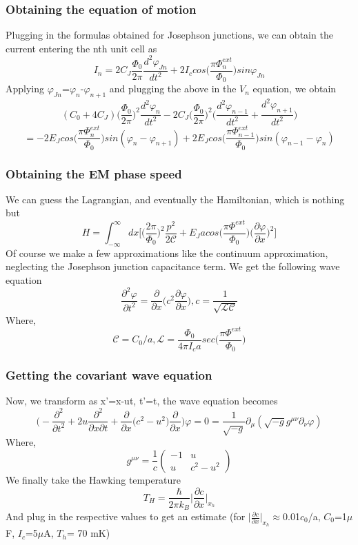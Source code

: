 \documentclass[11pt]{beamer}
\begin{document}
		\begin{frame}
			\frametitle{Obtaining the equation of motion}
			Plugging in the formulas obtained for Josephson junctions, we can obtain the current entering the nth unit cell as
			\[I_n=2 C_J \frac{\Phi_0}{2\pi}\frac{d^2\varphi_{Jn}}{dt^2}+2I_ccos\bigg(\frac{\pi \Phi^{ext}_n}{\Phi_0}\bigg)sin\varphi_{Jn}\]
			Applying $\varphi_{Jn}$=$\varphi_{n}$-$\varphi_{n+1}$ and plugging the above in the $V_n$ equation, we obtain
			\[(C_0+4C_J)\bigg(\frac{\Phi_0}{2\pi}\bigg)^2\frac{d^2\varphi_{n}}{dt^2}-2C_J\bigg(\frac{\Phi_0}{2\pi}\bigg)^2\bigg( \frac{d^2\varphi_{n-1}}{dt^2}+\frac{d^2\varphi_{n+1}}{dt^2}  \bigg)\]
			\[=-2E_Jcos\bigg(\frac{\pi \Phi^{ext}_n}{\Phi_0}\bigg)sin(\varphi_{n}-\varphi_{n+1})+2E_Jcos\bigg(\frac{\pi \Phi^{ext}_{n-1}}{\Phi_0}\bigg)sin(\varphi_{n-1}-\varphi_{n})\]
		\end{frame}
		
		\begin{frame}
			\frametitle{Obtaining the EM phase speed}
			We can guess the Lagrangian, and eventually the Hamiltonian, which is nothing but
			\[H=\int_{-\infty}^{\infty}dx\bigg[\bigg(\frac{2\pi}{\Phi_0}\bigg)^2\frac{p^2}{2\mathcal{C}}+E_Jacos\bigg(\frac{\pi \Phi^{ext}}{\Phi_0}\bigg)\bigg(\frac{\partial\varphi}{\partial x}\bigg)^2\bigg]\]
			Of course we make a few approximations like the continuum approximation, neglecting the Josephson junction capacitance term. 
			We get the following wave equation
			\[\frac{\partial^2\varphi}{\partial t^2}=\frac{\partial}{\partial x}\bigg(c^2\frac{\partial \varphi}{\partial x}\bigg),c=\frac{1}{\sqrt{\mathcal{L}\mathcal{C}}}\]
			Where,
			\[\mathcal{C}=C_0/a,\mathcal{L}=\frac{\Phi_0}{4\pi I_ca}sec\bigg(\frac{\pi \Phi^{ext}}{\Phi_0}\bigg)\]
		\end{frame}
		
			\begin{frame}
			\frametitle{Getting the covariant wave equation}
			Now, we transform as x'=x-ut, t'=t, the wave equation becomes 
			\[\bigg(-\frac{\partial^2}{\partial t^2}+2u\frac{\partial^2}{\partial x\partial t}+\frac{\partial}{\partial x}\big(c^2-u^2\big)\frac{\partial}{\partial x}\bigg)\varphi=0=\frac{1}{\sqrt{-g}}\partial_\mu(\sqrt{-g}g^{\mu\nu}\partial_\nu\varphi)\]
			Where,
			\[ g^{\mu\nu}=\frac{1}{c}
			\begin{pmatrix}
				-1 & u \\
				u & c^2-u^2 
			\end{pmatrix}
			\]
			We finally take the Hawking temperature
			\[T_H=\frac{\hbar}{2\pi k_B}\bigg|\frac{\partial c}{\partial x}\bigg|_{x_h}\]
			And plug in the respective values to get an estimate (for $\bigg|\frac{\partial c}{\partial x}\bigg|_{x_h}$$\approx$0.01$c_0$/a, $C_0$=1$\mu$ F, $I_c$=5$\mu$A, $T_h$= 70 mK)
		\end{frame}
		
\end{document}
